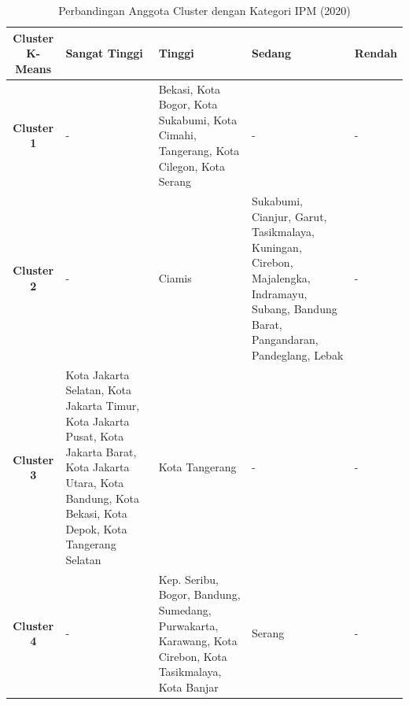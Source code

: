 \begin{table}[H]
\centering
\caption{Perbandingan Anggota Cluster dengan Kategori IPM (2020)} \label{tab:ipm_cross_2020}
\begin{tabular}{|c|p{2cm}|p{2cm}|p{2cm}|p{2cm}|}
\hline
\textbf{Cluster K-Means} & \textbf{Sangat Tinggi} & \textbf{Tinggi} & \textbf{Sedang} & \textbf{Rendah} \\ \hline
\textbf{Cluster 1} & - & Bekasi, Kota Bogor, Kota Sukabumi, Kota Cimahi, Tangerang, Kota Cilegon, Kota Serang & - & - \\ \hline
\textbf{Cluster 2} & - & Ciamis & Sukabumi, Cianjur, Garut, Tasikmalaya, Kuningan, Cirebon, Majalengka, Indramayu, Subang, Bandung Barat, Pangandaran, Pandeglang, Lebak & - \\ \hline
\textbf{Cluster 3} & Kota Jakarta Selatan, Kota Jakarta Timur, Kota Jakarta Pusat, Kota Jakarta Barat, Kota Jakarta Utara, Kota Bandung, Kota Bekasi, Kota Depok, Kota Tangerang Selatan & Kota Tangerang & - & - \\ \hline
\textbf{Cluster 4} & - & Kep. Seribu, Bogor, Bandung, Sumedang, Purwakarta, Karawang, Kota Cirebon, Kota Tasikmalaya, Kota Banjar & Serang & - \\ \hline
\end{tabular}
\end{table}